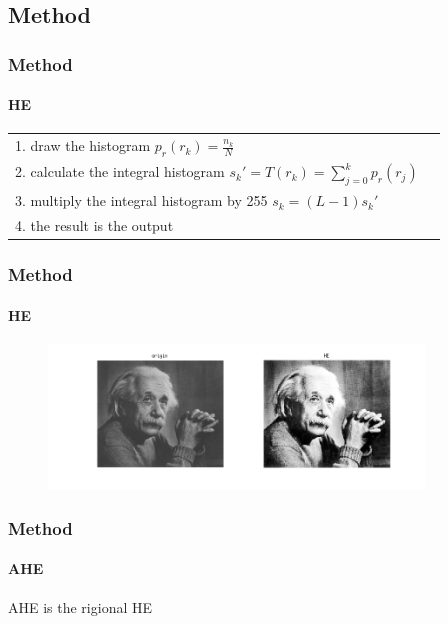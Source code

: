 \documentclass[11 pt,t]{beamer}
\begin{document}
\subsection{Method}

\begin{frame}
\frametitle{Method}
\framesubtitle{HE}

\begin{table}[!ht]
\toprule
\begin{tabular}{l p{.88\linewidth}}
\vspace{6pt}
1. draw the histogram $p_{r}\left(r_{k}\right)=\frac{n_{k}}{N}$\\
\vspace{6pt}
2. calculate the integral histogram $s_{k}'=T\left(r_{k}\right)=\sum^{k}_{j=0}p_{r}\left(r_{j}\right)$\\
\vspace{6pt}
3. multiply the integral histogram by 255 $s_{k}=\left(L-1\right)s_{k}'$\\
\vspace{6pt}
4. the result is the output
\end{tabular}
\end{table}
\end{frame}

\begin{frame}
\frametitle{Method}
\framesubtitle{HE}
\begin{minipage}[t]{\linewidth}\centering
\vspace{12pt}
\begin{figure}
   \includegraphics[width=10cm]{HEeinstein.png}
\end{figure}
\end{minipage}
\end{frame}

\begin{frame}
\frametitle{Method}
\framesubtitle{AHE}
\vspace{20pt}
\begin{center}
AHE is the rigional HE
\end{center}
\end{frame}
\end{document}
